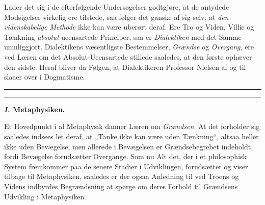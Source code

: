 \documentclass[12pt,a4paper]{book}
\newcommand{\opage}[1]{\marginnote{\footnotesize\textit{[#1]}}}
\begin{document}
Lader det sig i de efterfølgende Undersøgelser godtgjøre,
at de antydede Modsigelser virkelig ere tilstede,
saa følger det ganske af sig selv, at \emph{den videnskabelige
Methode} ikke kan være uberørt deraf. Ere Tro
og Viden, Villie og Tænkning \emph{absolut} ueensartede
Principer, saa er \emph{Dialektiken} med det Samme umuliggjort.
Dialektikens væsentligste Bestemmelser, \emph{Grændse}
og \emph{Overgang}, ere ved Læren om det Absolut-Ueensartede
stillede saaledes, at den første ophæver den sidste. Heraf
bliver da Følgen, at Dialektikeren Professor Nielsen
af og til slaaer over i Dogmatisme.
\begin{center}\rule[2.2pt]{0.32\textwidth}{0.4pt}\hspace*{-0.32\textwidth}\rule{0.32\textwidth}{0.4pt}\end{center}
\opage{10}\setcounter{footnote}{0}%
\begin{center}\textbf{\textit{I.} Metaphysiken.}\end{center}

Et Hovedpunkt i al Metaphysik danner Læren om
\emph{Grændsen}. At det forholder sig saaledes indsees let
deraf, at „Tanke ikke kan være uden Tænkning“, altsaa
heller ikke uden Bevægelse; men allerede i Bevægelsen
er Grændsebegrebet indeholdt, fordi Bevægelse forudsætter
Overgange. Som nu Alt det, der i et philosophisk
System fremkommer paa de senere Stadier i Udviklingen,
forudsætter og viser tilbage til Metaphysiken,
saaledes er der ogsaa Anledning til ved Troens og Videns
indbyrdes Begrændsning at spørge om deres Forhold
til Grændsens Udvikling i Metaphysiken.
\end{document}
